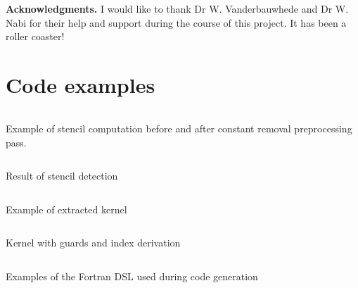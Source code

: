 \documentclass{mpaper}
\begin{document}
{\bf Acknowledgments.}
I would like to thank Dr W. Vanderbauwhede and Dr W. Nabi for their help and support during the course of this project. It has been a roller coaster!

\clearpage
\appendix

\section{Code examples}

\begin{listing}[ht]
\inputminted{fortran}{snippets/stencil_constant_removal.f95}
\caption{Example of stencil computation before and after constant removal preprocessing pass.}
\label{lst:stencil_constant_removal}
\end{listing}

\begin{listing}[ht]
\inputminted{fortran}{snippets/stencil_detection.f95}
\caption{Result of stencil detection}
\label{lst:stencil_detection}
\end{listing}

\begin{listing}[ht]
\inputminted{fortran}{snippets/kernel_extraction.f95}
\caption{Example of extracted kernel}
\label{lst:extracted_kernel}
\end{listing}

\begin{listing}[ht]
\inputminted{fortran}{snippets/kernel_with_loop_guards.f95}
\caption{Kernel with guards and index derivation}
\label{lst:with_loop_guards}
\end{listing}

\begin{listing}[ht]
\inputminted{haskell}{snippets/fortran_dsl_examples.hs}
\caption{Examples of the Fortran DSL used during code generation}
\label{lst:dsl_examples}
\end{listing}

% 
% 
\clearpage


\end{document}

